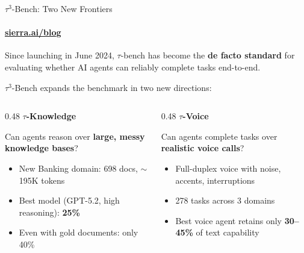 \documentclass[aspectratio=169]{beamer}
\newcommand{\taubench}{$\tau$-bench}
\begin{document}
\begin{frame}{$\tau^3$-Bench: Two New Frontiers}
  \framesubtitle{\href{https://sierra.ai/blog/bench-advancing-agent-benchmarking-to-knowledge-and-voice}{sierra.ai/blog}}

  Since launching in June 2024, \taubench{} has become the \textbf{de facto standard} for evaluating whether AI agents can reliably complete tasks end-to-end.

  \vspace{0.8em}
  $\tau^3$-Bench expands the benchmark in two new directions:

  \vspace{0.5em}
  \begin{columns}[T]
    \begin{column}{0.48\textwidth}
      \textbf{$\tau$-Knowledge}

      \vspace{0.3em}
      Can agents reason over \textbf{large, messy knowledge bases}?
      \begin{itemize}
        \item New Banking domain: 698 docs, $\sim$195K tokens
        \item Best model (GPT-5.2, high reasoning): \textbf{25\%}
        \item Even with gold documents: only 40\%
      \end{itemize}
    \end{column}
    \begin{column}{0.48\textwidth}
      \textbf{$\tau$-Voice}

      \vspace{0.3em}
      Can agents complete tasks over \textbf{realistic voice calls}?
      \begin{itemize}
        \item Full-duplex voice with noise, accents, interruptions
        \item 278 tasks across 3 domains
        \item Best voice agent retains only \textbf{30--45\%} of text capability
      \end{itemize}
    \end{column}
  \end{columns}

\end{frame}

\end{document}
